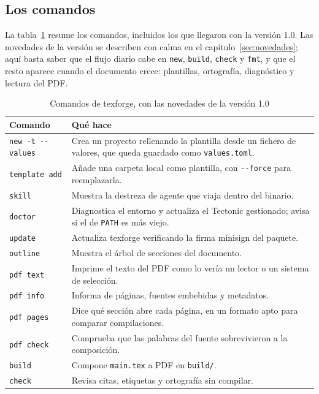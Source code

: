 \subsection{Los comandos}

La tabla~\ref{tab:comandos} resume los comandos, incluidos los que llegaron
con la versión 1.0. Las novedades de la versión se describen con calma en
el capítulo~\ref{sec:novedades}; aquí basta saber que el flujo diario
cabe en \texttt{new}, \texttt{build}, \texttt{check} y \texttt{fmt}, y que el
resto aparece cuando el documento crece: plantillas, ortografía,
diagnóstico y lectura del PDF.

\begin{table}[H]
  \centering
  \caption{Comandos de texforge, con las novedades de la versión 1.0}
  \label{tab:comandos}
  \begin{tabularx}{\linewidth}{@{}lX@{}}
    \toprule
    \sffamily\small\bfseries Comando & \sffamily\small\bfseries Qué hace \\
    \midrule
    \texttt{new -t -{}-values} & Crea un proyecto rellenando la plantilla desde un fichero de valores, que queda guardado como \texttt{values.toml}. \\
    \texttt{template add} & Añade una carpeta local como plantilla, con \texttt{-{}-force} para reemplazarla. \\
    \texttt{skill} & Muestra la destreza de agente que viaja dentro del binario. \\
    \texttt{doctor} & Diagnostica el entorno y actualiza el Tectonic gestionado; avisa si el de \texttt{PATH} es más viejo. \\
    \texttt{update} & Actualiza texforge verificando la firma minisign del paquete. \\
    \texttt{outline} & Muestra el árbol de secciones del documento. \\
    \texttt{pdf text} & Imprime el texto del PDF como lo vería un lector o un sistema de selección. \\
    \texttt{pdf info} & Informa de páginas, fuentes embebidas y metadatos. \\
    \texttt{pdf pages} & Dice qué sección abre cada página, en un formato apto para comparar compilaciones. \\
    \texttt{pdf check} & Comprueba que las palabras del fuente sobrevivieron a la composición. \\
    \texttt{build} & Compone \texttt{main.tex} a PDF en \texttt{build/}. \\
    \texttt{check} & Revisa citas, etiquetas y ortografía sin compilar. \\

\end{tabularx}
\end{table}
